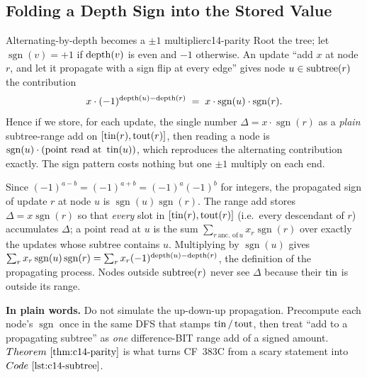 \subsection{Folding a Depth Sign into the Stored Value}

\begin{theorem}{Alternating-by-depth becomes a \(\pm1\) multiplier}{c14-parity}
Root the tree; let \(\operatorname{sgn}(v)=+1\) if \(\operatorname{depth}(v)\) is even and
\(-1\) otherwise.  An update ``add \(x\) at node \(r\), and let it propagate
with a sign flip at every edge'' gives node \(u\in\operatorname{subtree}(r)\) the
contribution
\[
  x\cdot(-1)^{\operatorname{depth}(u)-\operatorname{depth}(r)} \;=\; x\cdot\operatorname{sgn}(u)\cdot\operatorname{sgn}(r).
\]
Hence if we store, for each update, the single number \(\Delta=x\cdot\operatorname{sgn}(r)\)
as a \emph{plain} subtree-range add on \([\operatorname{tin}(r),\operatorname{tout}(r)]\), then reading a
node is \(\operatorname{sgn}(u)\cdot(\text{point read at }\operatorname{tin}(u))\), which
reproduces the alternating contribution exactly.  The sign pattern costs
nothing but one \(\pm1\) multiply on each end.
\end{theorem}
\begin{proofbox}
Since \((-1)^{a-b}=(-1)^{a+b}=(-1)^a(-1)^b\) for integers, the propagated
sign of update \(r\) at node \(u\) is \(\operatorname{sgn}(u)\operatorname{sgn}(r)\).
The range add stores \(\Delta=x\operatorname{sgn}(r)\) so that \emph{every}
slot in \([\operatorname{tin}(r),\operatorname{tout}(r)]\) (i.e.\ every descendant of \(r\)) accumulates
\(\Delta\); a point read at \(u\) is the sum \(\sum_{r\,\text{anc. of}\,u}
x_r\operatorname{sgn}(r)\) over exactly the updates whose subtree contains
\(u\).  Multiplying by \(\operatorname{sgn}(u)\) gives
\(\sum_r x_r\operatorname{sgn}(u)\operatorname{sgn}(r)=\sum_r x_r(-1)^{\operatorname{depth}(u)-\operatorname{depth}(r)}\),
the definition of the propagating process.  Nodes outside \(\operatorname{subtree}(r)\) never
see \(\Delta\) because their \(\operatorname{tin}\) is outside its range.
\end{proofbox}

\noindent\textbf{In plain words.}  Do not simulate the up-down-up propagation.
Precompute each node's \(\operatorname{sgn}\) once in the same DFS that stamps
\(\operatorname{tin}/\operatorname{tout}\), then treat ``add to a propagating subtree'' as \emph{one}
difference-BIT range add of a signed amount.  \(\thmref{c14-parity}\) is what
turns CF~383C from a scary statement into \(\coderef{c14-subtree}\).

